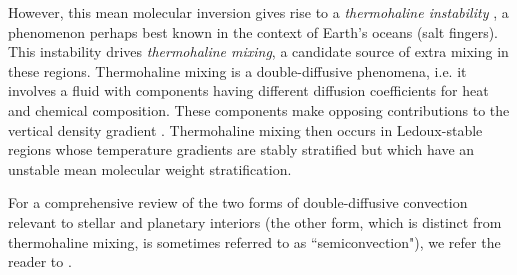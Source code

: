 

However, this mean molecular inversion gives rise to a \textit{thermohaline instability} \citep{CharbonnelZahn2007,CantielloLanger2010}, a phenomenon perhaps best known in the context of Earth's oceans (salt fingers). 
%
This instability drives \textit{thermohaline mixing}, a candidate source of extra mixing in these regions. 
Thermohaline mixing is a double-diffusive phenomena, i.e. it involves a fluid with components having different diffusion coefficients for heat and chemical composition. These components make opposing contributions to the vertical density gradient \citep{Turner:1974}. Thermohaline mixing then occurs in Ledoux-stable regions whose temperature gradients are stably stratified but which have an unstable mean molecular weight stratification.

For a comprehensive review of the two forms of double-diffusive convection relevant to stellar and planetary interiors (the other form, which is distinct from thermohaline mixing, is sometimes referred to as ``semiconvection"), %
we refer the reader to \citet{garaud_DDC_review_2018}. 


